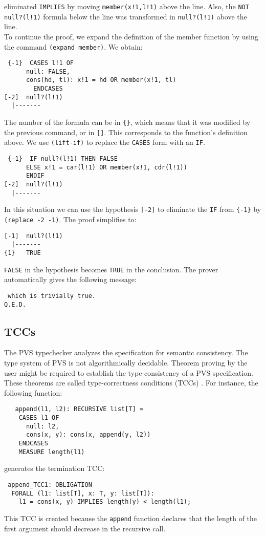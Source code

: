 \documentclass[a4paper,12pt]{article}
\begin{document}
eliminated \verb|IMPLIES| by moving \verb|member(x!1,l!1)| above the line. Also, the \verb|NOT null?(l!1)|
formula below the line was transformed in \verb|null?(l!1)| above the line.
\\To continue the proof, we expand the definition of the member function by using the command \verb|(expand member)|. 
We obtain:
\begin{verbatim}
 {-1}  CASES l!1 OF 
	  null: FALSE, 
	  cons(hd, tl): x!1 = hd OR member(x!1, tl)
        ENDCASES
[-2]  null?(l!1)
  |-------
\end{verbatim}
The number of the formula can be in \verb|{}|, which means that it was modified by the previous command, or in \verb|[]|.
This corresponds to the function's definition above. We use \verb|(lift-if)| to replace the \verb|CASES| form with an 
\verb|IF|.
\begin{verbatim}
 {-1}  IF null?(l!1) THEN FALSE
      ELSE x!1 = car(l!1) OR member(x!1, cdr(l!1))
      ENDIF
[-2]  null?(l!1)
  |-------
\end{verbatim}
In this situation we can use the hypothesis \verb|[-2]| to eliminate the \verb|IF| from \verb|{-1}| by \verb|(replace -2 -1)|.
The proof simplifies to:
\begin{verbatim}
[-1]  null?(l!1)
  |-------
{1}   TRUE
\end{verbatim}
\verb|FALSE| in the hypothesis becomes \verb|TRUE| in the conclusion. The prover automatically gives the following message:
\begin{verbatim}
 which is trivially true.
Q.E.D.
\end{verbatim}


\subsection{TCCs}
The PVS typechecker analyzes the specification for semantic consistency. The type system of PVS is not 
algorithmically decidable. Theorem proving by the user might be
required to establish the type-consistency of a PVS specification. These theorems are called type-correctness conditions 
(TCCs) \cite{userguide}. For instance, the following function:
\begin{verbatim}
   append(l1, l2): RECURSIVE list[T] =
    CASES l1 OF
      null: l2,
      cons(x, y): cons(x, append(y, l2))
    ENDCASES
    MEASURE length(l1)
\end{verbatim}
generates the termination TCC:
\begin{verbatim}
 append_TCC1: OBLIGATION
  FORALL (l1: list[T], x: T, y: list[T]):
    l1 = cons(x, y) IMPLIES length(y) < length(l1);
\end{verbatim}
This TCC is created because the \verb|append| function declares that the length of the first argument should decrease 
in the recursive call. 
\end{document}
